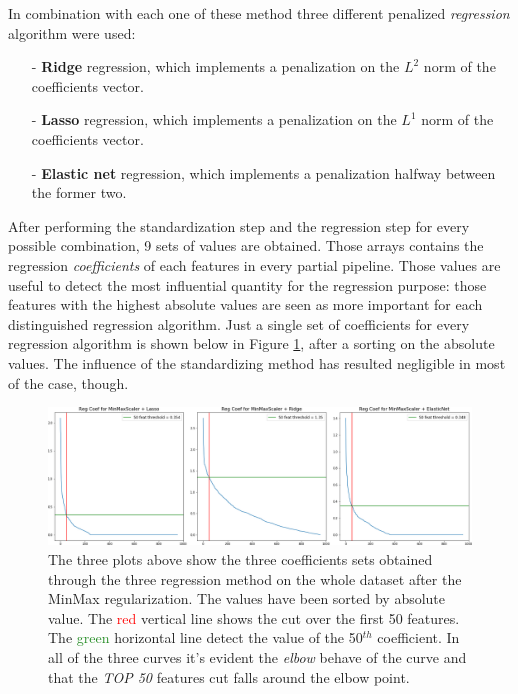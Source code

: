 \documentclass{article}
\begin{document}
In combination with each one of these method three different penalized \emph{regression} algorithm were used:

\begin{itemize}
\item [-]\textbf{Ridge} regression, which implements a penalization on the $L^2$ norm of the coefficients vector.
\item [-]\textbf{Lasso} regression, which implements a penalization on the $L^1$ norm of the coefficients vector.
\item [-]\textbf{Elastic net} regression, which implements a penalization halfway between the former two.
\end{itemize}

After performing the standardization step and the regression step for every possible combination, 9 sets of values are obtained. Those arrays contains the regression \emph{coefficients} of each features in every partial pipeline. Those values are useful to detect the most influential quantity for the regression purpose: those features with the highest absolute values are seen as more important for each distinguished regression algorithm. Just a single set of coefficients for every regression algorithm is shown below in Figure \ref{fig:3_coef}, after a sorting on the absolute values. The influence of the standardizing method has resulted negligible in most of the case, though.

\begin{figure}[ht]
	\includegraphics[width=\textwidth]{one_set_coefs.png}
	\caption{The three plots above show the three coefficients sets obtained through the three regression method on the whole dataset after the MinMax regularization. The values have been sorted by absolute value. The \textcolor{red}{red} vertical line shows the cut over the first 50 features. The \textcolor{ForestGreen}{green}  horizontal line detect the value of the 50$^{th}$ coefficient. In all of the three curves it's evident the \emph{elbow} behave of the curve and that the \emph{TOP 50} features cut falls around the elbow point.}
	\label{fig:3_coef}
	\centering
\end{figure}
\end{document}
